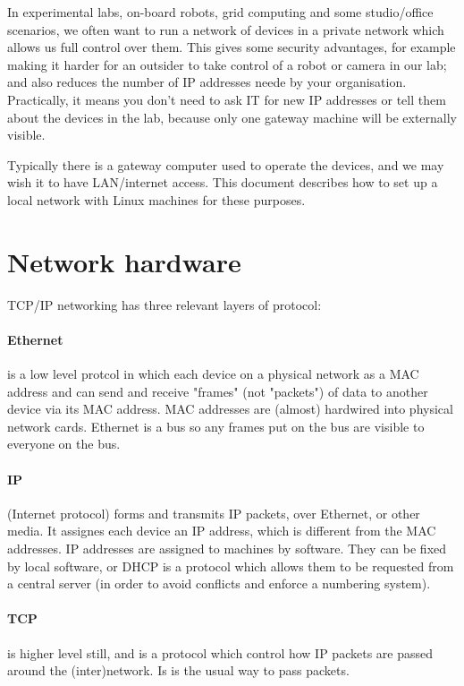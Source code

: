 \documentclass[oneside,english]{scrbook}
\begin{document}
In experimental labs, on-board robots, grid computing and some studio/office scenarios, we
often want to run a network of devices in a private network which
allows us full control over them.  This gives some security advantages, for example making it harder for an outsider to take control of a robot or camera in our lab; and also reduces the number of IP addresses neede by your organisation. Practically, it means you don't need to ask IT for new IP addresses or tell them about the devices in the lab, because only one gateway machine will be externally visible.

Typically there is a gateway computer
used to operate the devices, and we may wish
it to have LAN/internet access. This document describes how to set up
a local network with Linux machines for these purposes.


\section{Network hardware}

TCP/IP networking has three relevant layers of protocol:

\paragraph{Ethernet} is a low level protcol in which each device on a physical network as a MAC address and can send and receive "frames" (not "packets") of data to another device via its MAC address. MAC addresses are (almost) hardwired into physical network cards. Ethernet is a bus so any frames put on the bus are visible to everyone on the bus.

\paragraph{IP} (Internet protocol) forms and transmits IP packets, over Ethernet, or other media.  It assignes each device an IP address, which is different from the MAC addresses. IP addresses are assigned to machines by software. They can be fixed by local software, or DHCP is a protocol which allows them to be requested from a central server (in order to avoid conflicts and enforce a numbering system).

\paragraph{TCP} is higher level still, and is a protocol which control how IP packets are passed around the (inter)network. Is is the usual way to pass packets.
\end{document}
